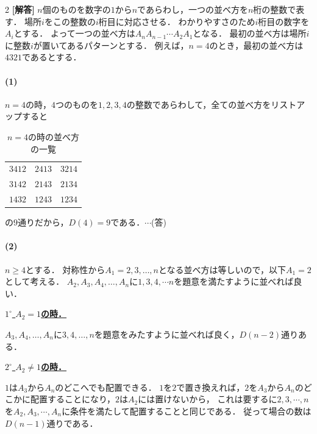 \documentclass[../../main.tex]{subfiles}
\begin{document}
\setcounter{equation}{0}
\setcounter{figure}{0}
\setcounter{table}{0}
\begin{oframed}
  
\end{oframed}
\setlength{\columnseprule}{0.4pt}
\begin{multicols}{2}
  {\bf [解答]}
  $n$個のものを数字の$1$から$n$であらわし，一つの並べ方を$n$桁の整数で表す．
  場所$i$をこの整数の$i$桁目に対応させる．
  わかりやすさのため$i$桁目の数字を$A_i$とする．
  よって一つの並べ方は$A_nA_{n-1}\cdots A_{2}A_{1}$となる．
  最初の並べ方は場所$i$に整数$i$が置いてあるパターンとする．
  例えば，$n=4$のとき，最初の並べ方は$4321$であるとする．

  \paragraph{(1)}
  $n=4$の時，$4$つのものを$1,2,3,4$の整数であらわして，全ての並べ方をリストアップすると
  \begin{table}[H]
    \centering
    \caption{$n=4$の時の並べ方の一覧}
    \begin{tabular}{ccc}
      $3412$ & $2413$ & $3214$ \\
      $3142$ & $2143$ & $2134$ \\
      $1432$ & $1243$ & $1234$ \\
    \end{tabular}
  \end{table}
  の$9$通りだから，$D(4)=9$である．$\cdots$(答)

  \paragraph{(2)}
  $n\ge 4$とする．
  対称性から$A_1=2,3,\dots,n$となる並べ方は等しいので，以下$A_1=2$として考える．
  $A_2,A_3, A_4, \dots, A_n$に$1,3,4,\cdots n$を題意を満たすように並べれば良い．

  \underline{\textbf{$1^{\circ}$ $A_2=1$の時．}}

  $A_3, A_4, \dots, A_n$に$3,4,\dots,n$を題意をみたすように並べれば良く，$D(n-2)$通りある．

  \underline{\textbf{$2^{\circ}$ $A_2\neq 1$の時．}}

  $1$は$A_3$から$A_n$のどこへでも配置できる．
  $1$を$2$で置き換えれば，$2$を$A_3$から$A_n$のどこかに配置することになり，$2$は$A_2$には置けないから，
  これは要するに$2,3,\cdots,n$を$A_2,A_3,\cdots, A_n$に条件を満たして配置することと同じである．
  従って場合の数は$D(n-1)$通りである．


\end{multicols}
\end{document}
